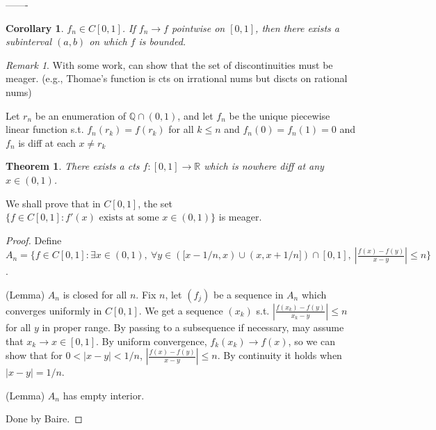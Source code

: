 \documentclass{article}
\theoremstyle{definition}
\theoremstyle{remark}
\newtheorem{rem}{Remark}
\theoremstyle{plain}
\newtheorem{thm}[defn]{Theorem}
\newtheorem{crly}[defn]{Corollary}
\newcommand{\QQ}{\mathbb{Q}}
\newcommand{\RR}{\mathbb{R}}
\begin{document}
-------

\begin{crly}
    $f_n\in C[0,1]$. If $f_n\to f$ pointwise on $[0,1]$, then there exists a subinterval $(a,b)$ on which $f$ is bounded.
\end{crly}
\begin{rem}
    With some work, can show that the set of discontinuities must be meager. (e.g., Thomae's function is cts on irrational nums but discts on rational nums) 

    Let $r_n$ be an enumeration of $\QQ\cap (0,1)$, and let $f_n$ be the unique piecewise linear function s.t. $f_n(r_k)=f(r_k)$ for all $k\le n$ and $f_n(0)=f_n(1)=0$ and $f_n$ is diff at each $x\neq r_k$
\end{rem}
\begin{thm}
    There exists a cts $f:[0,1]\to\RR$ which is nowhere diff at any $x\in(0,1)$.
\end{thm}
We shall prove that in $C[0,1]$, the set $\{f\in C[0,1]:f'(x)\text{ exists at some }x\in(0,1)\}$ is meager.
\begin{proof}
    Define $A_n=\{f\in C[0,1]:\exists x\in (0,1),\ \forall y\in ([x-1/n,x)\cup(x,x+1/n])\cap [0,1],\ |\frac{f(x)-f(y)}{x-y}|\le n\}$.

    (Lemma) $A_n$ is closed for all $n$. Fix $n$, let $(f_j)$ be a sequence in $A_n$ which converges uniformly in $C[0,1]$. We get a sequence $(x_k)$ s.t. $|\frac{f(x_k)-f(y)}{x_k-y}|\le n$ for all $y$ in proper range. By passing to a subsequence if necessary, may assume that $x_k\to x\in[0,1]$. By uniform convergence, $f_k(x_k)\to f(x)$, so we can show that for $0<|x-y|<1/n$, $|\frac{f(x)-f(y)}{x-y}|\le n$. By continuity it holds when $|x-y|=1/n$.

    (Lemma) $A_n$ has empty interior.

    Done by Baire.
\end{proof}
\end{document}
